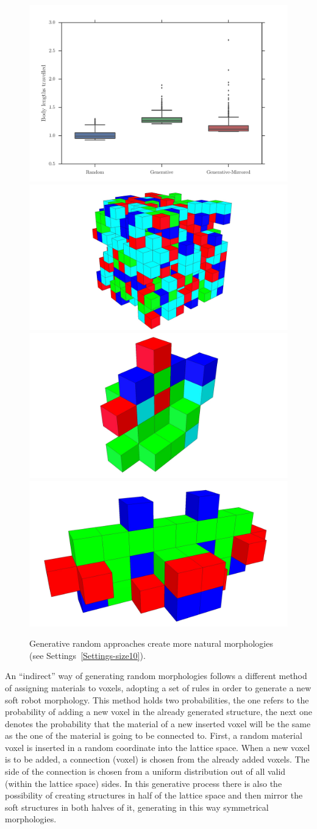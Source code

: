 \begin{figure}
\centering
\includegraphics[width=1.0\textwidth]{../Figures/Results/random.pdf}\\
\hspace{0.1cm}
\includegraphics[height=0.15\textwidth]{../Figures/Robots/random.jpg}
\includegraphics[height=0.15\textwidth]{../Figures/Robots/rg0.jpg}
\includegraphics[height=0.15\textwidth]{../Figures/Robots/rg1.jpg}
\caption{Generative random approaches create more natural morphologies (see Settings~\ref{Settings-size10}).}
\label{fig:randomResultsRobots}
\end{figure}

An ``indirect'' way of generating random morphologies follows a different method of assigning materials to voxels, adopting a set of rules in order to generate a new soft robot morphology. This method holds two probabilities, the one refers to the probability of adding a new voxel in the already generated structure, the next one denotes the probability that the material of a new inserted voxel will be the same as the one of the material is going to be connected to. First, a random material voxel is inserted in a random coordinate into the lattice space. When a new voxel is to be added, a connection (voxel) is chosen from the already added voxels. The side of the connection is chosen from a uniform distribution out of all valid (within the lattice space) sides. In this generative process there is also the possibility of creating structures in half of the lattice space and then mirror the soft structures in both halves of it, generating in this way symmetrical morphologies.

